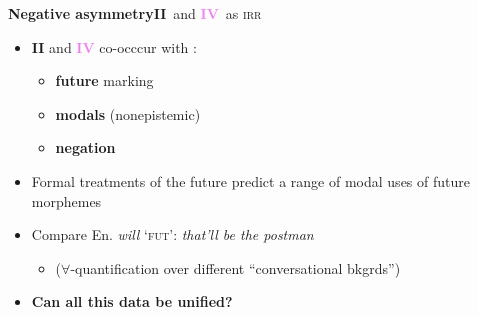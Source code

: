 \documentclass[dvipsnames]{beamer}%
\newcommand{\II}{\textbf{\textcolor{ochre}{II}}}
\newcommand{\IV}{\textbf{\textcolor{violet}{IV}}}
\begin{document}
\begin{frame}{\textbf{Negative asymmetry}\hfill\II~and \IV~as \textsc{irr}}
\begin{itemize}

\item \II{} and \IV{} co-occcur with :
\begin{itemize}
	\item \textbf{future} marking 
	\item  \textbf{modals} {\scriptsize (nonepistemic)}
	\item \textbf{negation}
\end{itemize}
	\item Formal treatments of the future predict a range of modal uses of future morphemes 
	\item Compare En. \textit{will} `\textsc{fut}': \textit{that'll be the postman}
\begin{itemize}\small 

	\item ($ \forall $-quantification over different ``conversational bkgrds'')
\end{itemize}
\item \textbf{Can all this data be unified?}

\end{itemize}
\end{frame}
 
\end{document}
